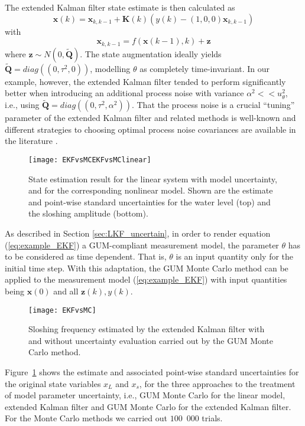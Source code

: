 \documentclass[10pt]{article}
\begin{document}
\begin{spacing}{1}
The extended Kalman filter state estimate is then calculated as
\begin{equation}
	\bm{x}(k) = \bm{x}_{k,k-1} + \bm{K}(k) \left( y(k) - \left( 1,0,0 \right)\bm{x}_{k,k-1} \right)
\label{eq:example_EKF}
\end{equation}
with
\[
\bm{x}_{k,k-1} = f(\bm{x}(k-1), k) + \bm{z}
\]
where $\bm{z}\sim N(0,\bm{\tilde{Q}})$. The state augmentation ideally yields $\bm{\tilde{Q}}=diag((0, \tau^2, 0))$, modelling $\theta$ as completely time-invariant. In our example, however, the extended Kalman filter tended to perform significantly better when introducing an additional process noise
with variance $\alpha^2 << u_\theta^2$, i.e., using $\bm{\tilde{Q}}=diag((0,\tau^2, \alpha^2))$. That the process noise is a crucial ``tuning'' parameter of the extended Kalman filter and related methods is well-known and different strategies to choosing optimal process noise covariances are available in the literature \cite{Bavdekar:2011it, Chatzi:2009jp}.

\begin{figure}[h!]	
	\centering
	\texttt{[image: EKFvsMCEKFvsMClinear]}
	\caption{State estimation result for the linear system with model uncertainty, and for the corresponding nonlinear model. Shown are the estimate and point-wise standard uncertainties for the water level (top) and the sloshing amplitude (bottom).}
	\label{fig:LKF_uncertainmodel}
\end{figure}
 
As described in Section \ref{sec:LKF_uncertain}, in order to render equation (\ref{eq:example_EKF}) a GUM-compliant measurement model, the parameter $\theta$ has to be considered as time dependent. That is, $\theta$ is an input quantity only for the initial time step. With this adaptation, the GUM Monte Carlo method can be applied to the measurement model (\ref{eq:example_EKF}) with input quantities being 
$\bm{x}(0)$ and all $\bm{z}(k), y(k)$.

\begin{figure}[h!]
	\centering
	\texttt{[image: EKFvsMC]}
	\caption{Sloshing frequency estimated by the extended Kalman filter with and without uncertainty evaluation carried out by the GUM Monte Carlo method.}
	\label{fig:EKFvsMCEKF}
\end{figure}

Figure~\ref{fig:LKF_uncertainmodel} shows the estimate and associated point-wise standard uncertainties for the original state variables $x_L$ and $x_s$, for the three approaches to the treatment of model parameter uncertainty, i.e., GUM Monte Carlo for the linear model, extended Kalman filter and GUM Monte Carlo for the extended Kalman filter. For the Monte Carlo methods we carried out $100$~$000$ trials.


\end{spacing}
\end{document}

